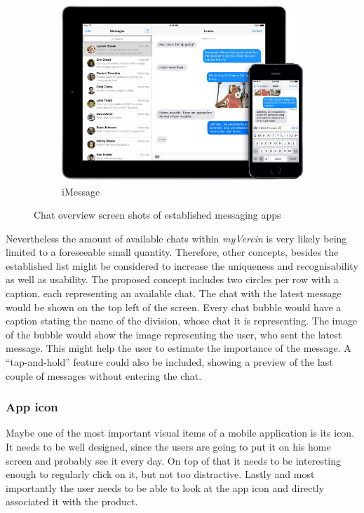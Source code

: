 \begin{figure}[h]
\begin{subfigure}{.66\textwidth}
  		\includegraphics[width=0.98\linewidth]{./images/imessage-screen.jpg}
  		\caption{iMessage}
  		\label{fig:ChatiMessage}
	\end{subfigure}
	\caption[Chat overview screen shots of established messaging apps retrieved from \cite{Inc.:2015aa} and \cite{Stuckler:2013aa}]{Chat overview screen shots of established messaging apps}
	\label{fig:ChatScreens}
\end{figure}
\nocite{Inc.:2015aa, Stuckler:2013aa}

Nevertheless the amount of available chats within \emph{myVerein} is very likely being limited to a foreseeable small quantity. Therefore, other concepts, besides the established list might be considered to increase the uniqueness and recognisability as well as usability. The proposed concept includes two circles per row with a caption, each representing an available chat. The chat with the latest message would be shown on the top left of the screen. Every chat bubble would have a caption stating the name of the division, whose chat it is representing. The image of the bubble would show the image representing the user, who sent the latest message. This might help the user to estimate the importance of the message. A \enquote{tap-and-hold} feature could also be included, showing a preview of the last couple of messages without entering the chat.

\subsubsection{App icon}
Maybe one of the most important visual items of a mobile application is its icon. It needs to be well designed, since the users are going to put it on his home screen and probably see it every day. On top of that it needs to be interesting enough to regularly click on it, but not too distractive. Lastly and most importantly the user needs to be able to look at the app icon and directly associated it with the product. \cite{Flarup:2015aa}


